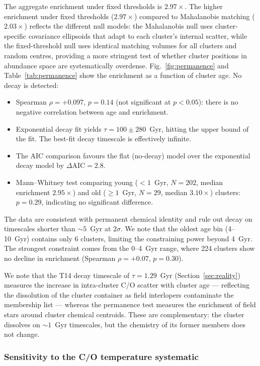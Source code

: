 \documentclass[fleqn,usenatbib]{mnras}
\newcommand{\co}{C/O\xspace}
\begin{document}
The aggregate enrichment under fixed thresholds is $2.97\times$. The higher enrichment under fixed thresholds ($2.97\times$) compared to Mahalanobis matching ($2.03\times$) reflects the different null models: the Mahalanobis null uses cluster-specific covariance ellipsoids that adapt to each cluster's internal scatter, while the fixed-threshold null uses identical matching volumes for all clusters and random centres, providing a more stringent test of whether cluster positions in abundance space are systematically overdense.
Fig.~\ref{fig:permanence} and Table~\ref{tab:permanence} show the enrichment as a function of cluster age.
No decay is detected:
\begin{itemize}
\item Spearman $\rho = +0.097$, $p = 0.14$ (not significant at $p < 0.05$): there is no negative correlation between age and enrichment.
\item Exponential decay fit yields $\tau = 100 \pm 280$~Gyr, hitting the upper bound of the fit. The best-fit decay timescale is effectively infinite.
\item The AIC comparison favours the flat (no-decay) model over the exponential decay model by $\Delta\mathrm{AIC} = 2.8$.
\item Mann--Whitney test comparing young ($< 1$~Gyr, $N = 202$, median enrichment $2.95\times$) and old ($\geq 1$~Gyr, $N = 29$, median $3.10\times$) clusters: $p = 0.29$, indicating no significant difference.
\end{itemize}

The data are consistent with permanent chemical identity and rule out decay on timescales shorter than ${\sim}5$~Gyr at $2\sigma$. We note that the oldest age bin (4--10~Gyr) contains only 6 clusters, limiting the constraining power beyond 4~Gyr. The strongest constraint comes from the 0--4~Gyr range, where 224 clusters show no decline in enrichment (Spearman $\rho = +0.07$, $p = 0.30$).

We note that the T14 decay timescale of $\tau = 1.29$~Gyr (Section~\ref{sec:reality}) measures the increase in intra-cluster \co scatter with cluster age --- reflecting the dissolution of the cluster container as field interlopers contaminate the membership list --- whereas the permanence test measures the enrichment of field stars around cluster chemical centroids. These are complementary: the cluster dissolves on ${\sim}1$~Gyr timescales, but the chemistry of its former members does not change.

\subsubsection{Sensitivity to the C/O temperature systematic}
\end{document}
